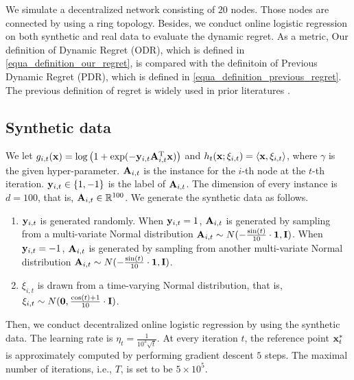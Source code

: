 \documentclass{article}
\begin{document}
We simulate a decentralized network consisting of $20$ nodes. Those nodes are connected by using a ring topology. Besides, we conduct online logistic regression on both synthetic and real data to evaluate the dynamic regret. As a metric, Our definition of Dynamic Regret (ODR), which is defined in \eqref{equa_definition_our_regret}, is compared with the  definitoin of Previous  Dynamic Regret (PDR), which is defined in \eqref{equa_definition_previous_regret}. The previous definition of regret is widely used in prior literatures \citep{Zinkevich:2003,Gyorgy:2016,8015179Shahram,Zhao:2018wx}. 


\subsection{Synthetic data}
We let $g_{i,t}({\bf x}) = \log\left( 1+\exp(-{\bf y}_{i,t}{\bf A}_{i,t}^{\rm T} {\bf x}) \right)$ and $h_t({\bf x};\xi_{i,t}) = \left\langle{\bf x}, \xi_{i,t} \right\rangle$, where $\gamma$ is the given hyper-parameter. ${\bf A}_{i,t}$ is the instance for the $i$-th node at the $t$-th iteration. ${\bf y}_{i,t}\in\{1,-1\}$ is the label of ${\bf A}_{i,t}$. The dimension of every instance is $d = 100$, that is, ${\bf A}_{i,t}\in\mathbb{R}^{100}$. We generate the synthetic data as follows.
\begin{enumerate}
\item ${\bf y}_{i,t}$ is generated randomly. When ${\bf y}_{i,t}=1$, ${\bf A}_{i,t}$ is generated by sampling from a multi-variate Normal distribution ${\bf A}_{i,t} \sim N(-\frac{\sin(t)}{10}\cdot{\bf 1}, {\bf I})$. When ${\bf y}_{i,t} = -1$, ${\bf A}_{i,t}$ is generated by sampling from another multi-variate Normal distribution ${\bf A}_{i,t} \sim N(-\frac{\sin(t)}{10}\cdot{\bf 1}, {\bf I})$.
\item $\xi_{i,t}$ is drawn from a time-varying Normal distribution, that is, $\xi_{i,t} \sim N({\bf 0}, \frac{\cos(t)+1}{10}\cdot{\bf I})$.
\end{enumerate}    Then, we conduct decentralized online logistic regression by using the synthetic data.  The learning rate is $\eta_t = \frac{1}{10^3\sqrt{t}}$. At every iteration $t$, the reference point ${\bf x}_t^\ast$ is approximately computed by performing  gradient descent $5$ steps. The maximal number of iterations, i.e., $T$, is set to be $5\times 10^5$.  
\end{document}
